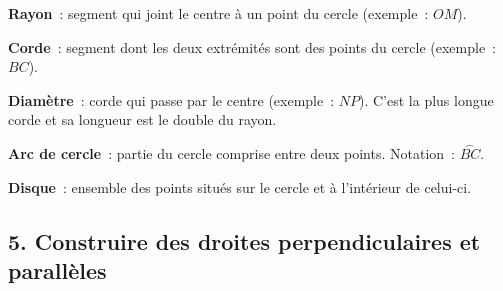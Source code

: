 \vspace{8pt}
\noindent\begin{minipage}[c]{0.52\linewidth}
\textcolor{themeColor}{\textbf{Rayon}}~: segment qui joint le centre à un point du cercle (exemple~: $OM$).\par\vspace{4pt}
\textcolor{themeColor}{\textbf{Corde}}~: segment dont les deux extrémités sont des points du cercle (exemple~: $BC$).\par\vspace{4pt}
\textcolor{themeColor}{\textbf{Diamètre}}~: corde qui passe par le centre (exemple~: $NP$). C'est la plus longue corde et sa longueur est le double du rayon.\par\vspace{4pt}
\textcolor{themeColor}{\textbf{Arc de cercle}}~: partie du cercle comprise entre deux points. Notation~: $\overset{\frown}{BC}$.\par\vspace{4pt}
\textcolor{themeColor}{\textbf{Disque}}~: ensemble des points situés sur le cercle et à l'intérieur de celui-ci.
\end{minipage}\hfill
\begin{minipage}[c]{0.44\linewidth}
\centering
{}
\end{minipage}

\vfill
\subsection*{5. Construire des droites perpendiculaires et parallèles}

